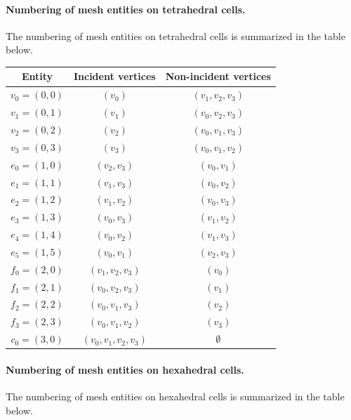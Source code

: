 \paragraph{Numbering of mesh entities on tetrahedral cells.}

The numbering of mesh entities on tetrahedral cells is summarized in the
table below.

\begin{center}
  \begin{tabular}{ccc}
    \toprule
    Entity & Incident vertices & Non-incident vertices \\
    \hline
    $v_0 = (0, 0)$ & $(v_0)$ & $(v_1, v_2, v_3)$ \\
    $v_1 = (0, 1)$ & $(v_1)$ & $(v_0, v_2, v_3)$ \\
    $v_2 = (0, 2)$ & $(v_2)$ & $(v_0, v_1, v_3)$ \\
    $v_3 = (0, 3)$ & $(v_3)$ & $(v_0, v_1, v_2)$ \\
    $e_0 = (1, 0)$ & $(v_2, v_3)$ & $(v_0, v_1)$ \\
    $e_1 = (1, 1)$ & $(v_1, v_3)$ & $(v_0, v_2)$ \\
    $e_2 = (1, 2)$ & $(v_1, v_2)$ & $(v_0, v_3)$ \\
    $e_3 = (1, 3)$ & $(v_0, v_3)$ & $(v_1, v_2)$ \\
    $e_4 = (1, 4)$ & $(v_0, v_2)$ & $(v_1, v_3)$ \\
    $e_5 = (1, 5)$ & $(v_0, v_1)$ & $(v_2, v_3)$ \\
    $f_0 = (2, 0)$ & $(v_1, v_2, v_3)$ & $(v_0)$ \\
    $f_1 = (2, 1)$ & $(v_0, v_2, v_3)$ & $(v_1)$ \\
    $f_2 = (2, 2)$ & $(v_0, v_1, v_3)$ & $(v_2)$ \\
    $f_3 = (2, 3)$ & $(v_0, v_1, v_2)$ & $(v_3)$ \\
    $c_0 = (3, 0)$ & $(v_0, v_1, v_2, v_3)$ & $\emptyset$ \\
    \bottomrule
  \end{tabular}
\end{center}

\paragraph{Numbering of mesh entities on hexahedral cells.}

The numbering of mesh entities on hexahedral cells is summarized in
the table below.

